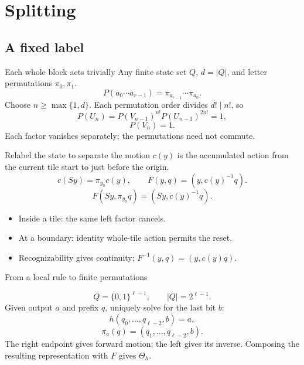\documentclass{beamer}
\begin{document}
\section{Splitting}
\subsection{A fixed label}

\begin{frame}{Each whole block acts trivially}
Any finite state set $Q$, $d=|Q|$, and letter permutations $\pi_0,\pi_1$.
\[
P(a_0\cdots a_{r-1})=\pi_{a_{r-1}}\cdots\pi_{a_0}.
\]
Choose $n\geq\max\{1,d\}$. Each permutation order divides $d!\mid n!$, so
\[
P(U_n)=P(V_{n-1})^{n!}P(U_{n-1})^{2n!}=1,
\]
\[
P(V_n)=1.
\]
Each factor vanishes separately; the permutations need not commute.
\end{frame}

\begin{frame}{Relabel the state to separate the motion}
$c(y)$ is the accumulated action from the current tile start to just before the origin.
\[
c(Sy)=\pi_{y_0}c(y),\qquad F(y,q)=(y,c(y)^{-1}q).
\]
\[
F(Sy,\pi_{y_0}q)=(Sy,c(y)^{-1}q).
\]
\begin{itemize}
\item Inside a tile: the same left factor cancels.
\item At a boundary: identity whole-tile action permits the reset.
\item Recognizability gives continuity; $F^{-1}(y,q)=(y,c(y)q)$.
\end{itemize}
\end{frame}

\begin{frame}{From a local rule to finite permutations}

\[
Q=\{0,1\}^{\ell-1},\qquad |Q|=2^{\ell-1}.
\]
Given output $a$ and prefix $q$, uniquely solve for the last bit $b$:
\[
h(q_0,\ldots,q_{\ell-2},b)=a,
\]
\[
\pi_a(q)=(q_1,\ldots,q_{\ell-2},b).
\]
The right endpoint gives forward motion; the left gives its inverse. Composing the resulting representation with $F$ gives $\Theta_h$.
\end{frame}
\end{document}
